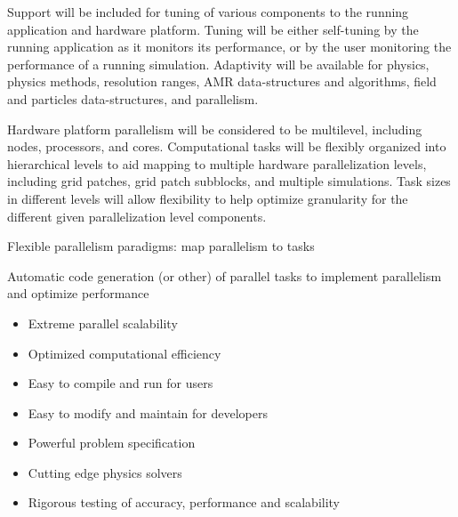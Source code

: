 
   Support will be included for tuning of various components to the
   running application and hardware platform.  Tuning will be either
   self-tuning by the running application as it monitors its
   performance, or by the user monitoring the performance of a running
   simulation.  Adaptivity will be available for physics, physics
   methods, resolution ranges, AMR data-structures and algorithms,
   field and particles data-structures, and parallelism.

Hardware platform parallelism will be considered to be multilevel,
including nodes, processors, and cores.  Computational tasks will be
flexibly organized into hierarchical levels to aid mapping to multiple
hardware parallelization levels, including grid patches, grid patch
subblocks, and multiple simulations.  Task sizes in different levels
will allow flexibility to help optimize granularity for the different
given parallelization level components.

Flexible parallelism paradigms: map parallelism to tasks

Automatic code generation (or other) of parallel tasks to implement
parallelism and optimize performance

\begin{itemize}
\item Extreme parallel scalability
\item Optimized computational efficiency
\item Easy to compile and run for users
\item Easy to modify and maintain for developers
\item Powerful problem specification
\item Cutting edge physics solvers
\item Rigorous testing of accuracy, performance and scalability
\end{itemize}
